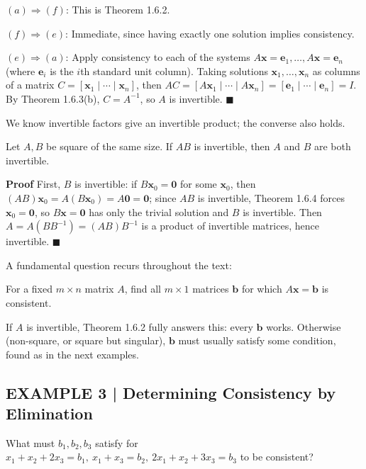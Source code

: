 \documentclass{article}
\theoremstyle{mystyle}
\begin{document}
$(a)\Rightarrow(f)$: This is Theorem 1.6.2.

$(f)\Rightarrow(e)$: Immediate, since having exactly one solution implies consistency.

$(e)\Rightarrow(a)$: Apply consistency to each of the systems $A\mathbf{x}=\mathbf{e}_1,\dots,A\mathbf{x}=\mathbf{e}_n$ (where $\mathbf{e}_i$ is the $i$th standard unit column). Taking solutions $\mathbf{x}_1,\dots,\mathbf{x}_n$ as columns of a matrix $C=[\mathbf{x}_1\mid\cdots\mid\mathbf{x}_n]$, then $AC=[A\mathbf{x}_1\mid\cdots\mid A\mathbf{x}_n]=[\mathbf{e}_1\mid\cdots\mid\mathbf{e}_n]=I$. By Theorem 1.6.3(b), $C=A^{-1}$, so $A$ is invertible. $\blacksquare$

We know invertible factors give an invertible product; the converse also holds.

\begin{tcolorbox}[colback=red!4, colframe=red!60!black, title=Theorem 1.6.5, boxrule=0.5mm, arc=3mm]
Let $A,B$ be square of the same size. If $AB$ is invertible, then $A$ and $B$ are both invertible.
\end{tcolorbox}
\textbf{Proof} First, $B$ is invertible: if $B\mathbf{x}_0=\mathbf{0}$ for some $\mathbf{x}_0$, then $(AB)\mathbf{x}_0=A(B\mathbf{x}_0)=A\mathbf{0}=\mathbf{0}$; since $AB$ is invertible, Theorem 1.6.4 forces $\mathbf{x}_0=\mathbf{0}$, so $B\mathbf{x}=\mathbf{0}$ has only the trivial solution and $B$ is invertible. Then $A=A(BB^{-1})=(AB)B^{-1}$ is a product of invertible matrices, hence invertible. $\blacksquare$

A fundamental question recurs throughout the text:

\begin{tcolorbox}[colback=blue!5, colframe=blue!60!black, title=A Fundamental Problem, boxrule=0.5mm, arc=3mm]
For a fixed $m\times n$ matrix $A$, find all $m\times1$ matrices $\mathbf{b}$ for which $A\mathbf{x}=\mathbf{b}$ is consistent.
\end{tcolorbox}
If $A$ is invertible, Theorem 1.6.2 fully answers this: every $\mathbf{b}$ works. Otherwise (non-square, or square but singular), $\mathbf{b}$ must usually satisfy some condition, found as in the next examples.

\subsection*{EXAMPLE 3 | Determining Consistency by Elimination}
What must $b_1,b_2,b_3$ satisfy for $x_1+x_2+2x_3=b_1,\ x_1+x_3=b_2,\ 2x_1+x_2+3x_3=b_3$ to be consistent?
\end{document}
